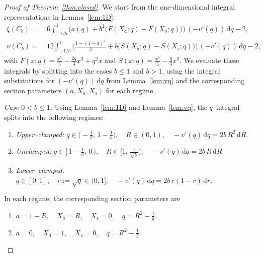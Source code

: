 \documentclass{article}
\newcommand{\1}{\mathds{1}}
\newcommand{\de}{\mathrm{\,d}}
\begin{document}
\begin{proof}[Proof of Theorem~\ref{thm:closed}]
We start from the one-dimensional integral representations in Lemma~\ref{lem:1D}:
\begin{align*}
\xi(C_b)=~&6\!\!\int_{-1/b}^{1}\!\!\Big(a(q)+b^2\big(F(X_a;q)-F(X_s;q)\big)\Big)\,(-v'(q))\de q-2, \\
\nu(C_b)=~&12\!\!\int_{-1/b}^{1}\!\!\Big(\frac{1-(1-a)^3}{3}+b\big(S(X_a;q)-S(X_s;q)\big)\Big)\,(-v'(q))\de q-2,
\end{align*}
with $F(x;q)=\frac{x^5}{5}-\frac{2q}{3}x^3+q^2x$ and $S(x;q)=\frac{x^5}{5}-\frac{q}{3}x^3$.
We evaluate these integrals by splitting into the cases $b\le 1$ and $b>1$, using the integral substitutions for $(-v'(q))\de q$ from Lemma~\ref{lem:vq} and the corresponding section parameters $(a, X_a, X_s)$ for each regime.

\smallskip
\noindent\emph{Case \(0<b\le 1\).}
Using Lemma~\ref{lem:1D} and Lemma~\ref{lem:vq}, the \(q\)–integral splits into the following regimes:
\begin{enumerate}[label=(\roman*)]
\item \emph{Upper–clamped:} 
\(
q\in\bigl(-\tfrac{1}{b},\,1-\tfrac{1}{b}\bigr), 
\quad 
R\in(0,1),
\quad 
 -v'(q)\de q = 2b\,R^{2}\de R.
\)

\item \emph{Unclamped:} 
\(
q\in\bigl[\,1-\tfrac{1}{b},\,0\,\bigr),
\quad 
R\in\bigl[1,\,\tfrac{1}{\sqrt b}\bigr),
\quad 
 -v'(q)\de q = 2b\,R\de R.
\)

\item[(iv)] \emph{Lower–clamped:} 
\(
q\in[0,1],
\quad 
r:=\sqrt q\in(0,1],
\quad 
 -v'(q)\de q = 2b\,r(1-r)\de r.
\)
\end{enumerate}

\noindent
In each regime, the corresponding section parameters are
\begin{enumerate}[label=(\roman*)]
\item \(a = 1-R,\quad X_a = R,\quad X_s = 0,\quad q = R^{2}-\tfrac{1}{b}.\)

\item \(a = 0,\quad X_a = 1,\quad X_s = 0,\quad q = R^{2}-\tfrac{1}{b}.\)


\end{enumerate}
\end{proof}
\end{document}
